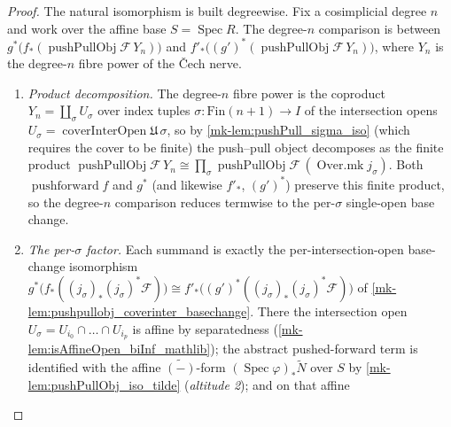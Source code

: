 \begin{proof}
  The natural isomorphism is built degreewise. Fix a cosimplicial degree \(n\) and work over
  the affine base \(S = \operatorname{Spec} R\). The degree-\(n\) comparison is between
  \(g^*\bigl(f_*(\operatorname{pushPullObj}\mathcal{F}\, Y_n)\bigr)\) and
  \(f'_*\bigl((g')^*(\operatorname{pushPullObj}\mathcal{F}\, Y_n)\bigr)\), where \(Y_n\) is the
  degree-\(n\) fibre power of the {\v C}ech nerve.
  \begin{enumerate}
    \item \emph{Product decomposition.} The degree-\(n\) fibre power is the coproduct
      \(Y_n = \coprod_\sigma U_\sigma\) over index tuples \(\sigma : \mathrm{Fin}(n+1) \to I\)
      of the intersection opens \(U_\sigma = \operatorname{coverInterOpen}\mathfrak{U}\,\sigma\),
      so by \ref{mk-lem:pushPull_sigma_iso} (which requires the cover to be finite) the
      push--pull object decomposes as the finite product \(\operatorname{pushPullObj}\mathcal{F}\,
      Y_n \cong \prod_\sigma \operatorname{pushPullObj}\mathcal{F}\,(\operatorname{Over.mk}
      j_\sigma)\). Both \(\operatorname{pushforward} f\) and \(g^*\) (and likewise \(f'_*\),
      \((g')^*\)) preserve this finite product, so the degree-\(n\) comparison reduces termwise
      to the per-\(\sigma\) single-open base change.
    \item \emph{The per-\(\sigma\) factor.} Each summand is exactly the per-intersection-open
      base-change isomorphism \(g^*\bigl(f_*((j_\sigma)_*(j_\sigma)^*\mathcal{F})\bigr) \cong
      f'_*\bigl((g')^*((j_\sigma)_*(j_\sigma)^*\mathcal{F})\bigr)\) of
      \ref{mk-lem:pushpullobj_coverinter_basechange}. There the intersection open
      \(U_\sigma = U_{i_0} \cap \dots \cap U_{i_p}\) is affine by separatedness
      (\ref{mk-lem:isAffineOpen_biInf_mathlib}); the abstract pushed-forward term is identified
      with the affine \(\widetilde{(-)}\)-form \((\operatorname{Spec}\varphi)_*\widetilde{N}\)
      over \(S\) by \ref{mk-lem:pushPullObj_iso_tilde} (\emph{altitude 2}); and on that affine

\end{enumerate}
\end{proof}

